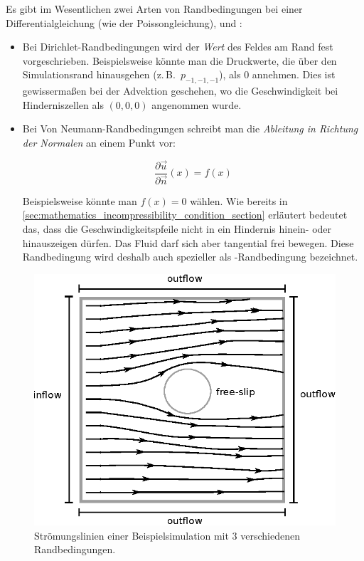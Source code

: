 Es gibt im Wesentlichen zwei Arten von Randbedingungen bei einer
Differentialgleichung (wie der Poissongleichung),
 und
:

\begin{itemize}
\item
	Bei Dirichlet-Randbedingungen wird der \emph{Wert} des Feldes am Rand
	fest vorgeschrieben. Beispielsweise könnte man die Druckwerte, die über
	den Simulationsrand hinausgehen (z.\,B.\ $p_{-1,-1,-1}$), als $0$ annehmen.
	Dies ist gewissermaßen bei der Advektion geschehen, wo die
	Geschwindigkeit bei Hinderniszellen als $(0,0,0)$ angenommen wurde.
\item
	Bei Von Neumann-Randbedingungen schreibt man die \emph{Ableitung in
	Richtung der Normalen} an einem Punkt vor:

	\begin{equation}
	\frac{
		\partial \vec{u}
	}
	{
		\partial \vec{n}
	}(x)
	=
	f(x)
	\end{equation}

	Beispielsweise könnte man $f(x)=0$ wählen. Wie bereits in
	\autoref{sec:mathematics_incompressibility_condition_section} erläutert
	bedeutet das, dass die Geschwindigkeitspfeile nicht in ein Hindernis
	hinein- oder hinauszeigen dürfen. Das Fluid darf sich aber tangential
	frei bewegen. Diese Randbedingung wird deshalb auch spezieller als
	-Randbedingung bezeichnet.
\end{itemize}

\begin{figure}[ht]
\centering
\includegraphics[width=12cm]{images/boundary_types}
\caption{Strömungslinien einer Beispielsimulation mit 3 verschiedenen Randbedingungen.}
\label{fig:stam_boundary_types}
\end{figure}

